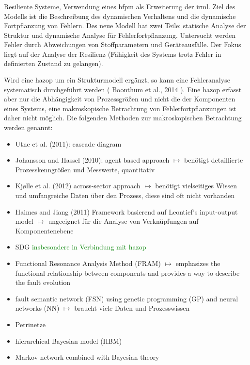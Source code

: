 \subsubsection{\cite{Cai_2015}} Resiliente Systeme, Verwendung eines \ac{hfpm} als Erweiterung der \ac{irml}. Ziel des Modells ist die Beschreibung des dynamischen Verhaltens und die dynamische Fortpflanzung von Fehlern. Des neue Modell hat zwei Teile: statische Analyse der Struktur und dynamische Analyse f\"ur Fehlerfortpflanzung. Untersucht werden Fehler durch Abweichungen von Stoffparametern und Ger\"ateausf\"alle. Der Fokus liegt auf der Analyse der Resilienz (F\"ahigkeit des Systems trotz Fehler in definierten Zustand zu gelangen). \linebreak

Wird eine \ac{hazop} um ein Strukturmodell erg\"anzt, so kann eine Fehleranalyse systematisch durchgef\"uhrt werden ( Boonthum et al., 2014 ). Eine \ac{hazop} erfasst aber nur die Abh\"angigkeit von Prozessgr\"o\ss{}en und nicht die der Komponenten eines Systems, eine makroskopische Betrachtung von Fehlerfortpflanzungen ist daher nicht m\"oglich. Die folgenden Methoden zur makroskopischen Betrachtung werden genannt: 
\begin{itemize}
\item Utne et al. (2011): cascade diagram
\item Johansson and Hassel (2010): agent based approach $\mapsto$ ben\"otigt detaillierte Prozesskenngr\"o\ss{}en und Messwerte, quantitativ
\item  Kj{\o}lle et al. (2012) across-sector approach $\mapsto$ ben\"otigt vielseitiges Wissen und umfangreiche Daten \"uber den Prozess, diese sind oft nicht vorhanden
\item Haimes and Jiang (2011) Framework basierend auf Leontief’s input-output model $\mapsto$ ungeeignet f\"ur die Analyse von Verkn\"upfungen auf Komponentenebene
\item SDG \textcolor{green}{insbesondere in Verbindung mit \ac{hazop}}
\item Functional Resonance Analysis Method (FRAM) $\mapsto$ emphasizes the functional relationship between components and provides a way to describe the fault evolution
\item fault semantic network (FSN) using genetic programming (GP) and neural networks (NN) $\mapsto$ braucht viele Daten und Prozesswissen
\item Petrinetze
\item hierarchical Bayesian model (HBM)
\item Markov network combined with Bayesian theory
\end{itemize}
